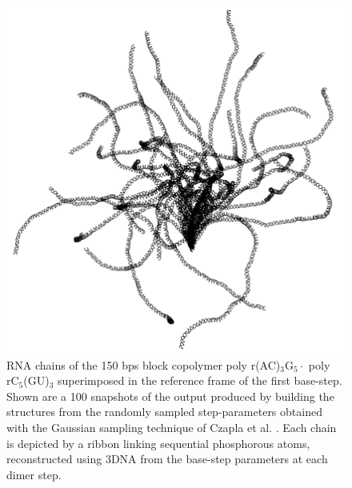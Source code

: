 \begin{figure}
\centering
\includegraphics[angle=0, scale=2.0]{Chapter4/polyacacacggggg_all.png}
\caption{RNA   chains   of   the   150  bps   block   copolymer   poly
  r(AC)$_{\text{3}}$G$_{\text{5}}\cdot$                            poly
  rC$_{\text{5}}$(GU)$_{\text{3}}$ superimposed in the reference frame
  of the  first base-step.   Shown are a  100 snapshots of  the output
  produced  by  building  the  structures from  the  randomly  sampled
  step-parameters  obtained with  the Gaussian  sampling  technique of
  Czapla et al. \cite{czapla2006}.  Each chain is depicted by a ribbon
  linking sequential phosphorous  atoms, reconstructed using 3DNA from
  the base-step parameters at each dimer step.}
\label{fig:rnatree}
\end{figure}  


















